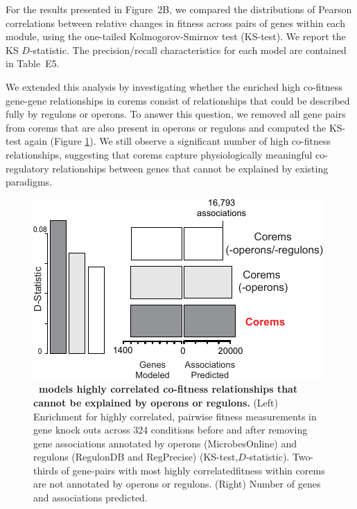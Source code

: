 For the results presented in Figure~2B, we compared the distributions
of Pearson correlations between relative changes in fitness across
pairs of genes within each module, using the one-tailed
Kolmogorov-Smirnov test (KS-test). We report the KS $D$-statistic. The
precision/recall characteristics for each model are contained in Table~E5.

We extended this analysis by investigating whether the enriched high
co-fitness gene-gene relationships in corems consist of relationships
that could be described fully by regulons or operons. To answer this
question, we removed all gene pairs from corems that are also present
in operons or regulons and computed the KS-test again (Figure
\ref{fig:fitness_wo_operons}). We still observe a significant number
of high co-fitness relationships, suggesting that corems capture
physiologically meaningful co-regulatory relationships between genes
that cannot be explained by existing paradigms.

\begin{figure}[hp]
\centering
\includegraphics[width=0.75\linewidth]{figures/fitness_wo_operons.pdf}
\caption[\egrine~models highly correlated co-fitness relationships
  that cannot be explained by operons or
  regulons]{\textbf{\egrine~models highly correlated co-fitness
    relationships that cannot be explained by operons or regulons.}
  (Left) Enrichment for highly correlated, pairwise fitness
  measurements in gene knock outs across 324 conditions before and
  after removing gene associations annotated by operons
  (MicrobesOnline) and regulons (RegulonDB and RegPrecise)
  (KS-test,$D$-statistic). Two-thirds of gene-pairs with most highly
  correlatedfitness within corems are not annotated by operons or
  regulons. (Right) Number of genes and associations predicted.}
\label{fig:fitness_wo_operons}
\end{figure}
